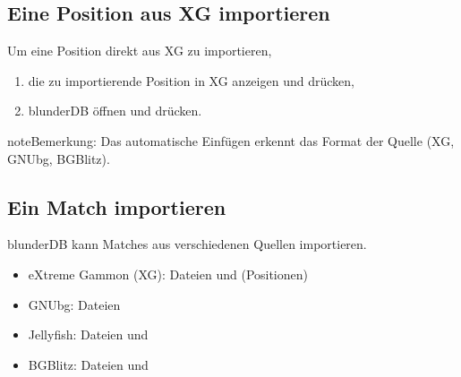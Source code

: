 \documentclass[letterpaper,10pt,german]{sphinxmanual}
\begin{document}
\subsection{Eine Position aus XG importieren}
\label{\detokenize{guide_utilisateur:import-une-position-depuis-xg}}
\sphinxAtStartPar
Um eine Position direkt aus XG zu importieren,
\begin{enumerate}
%
\item {} 
\sphinxAtStartPar
die zu importierende Position in XG anzeigen und  drücken,

\item {} 
\sphinxAtStartPar
blunderDB öffnen und  drücken.

\end{enumerate}

\begin{sphinxadmonition}{note}{Bemerkung:}
\sphinxAtStartPar
Das automatische Einfügen erkennt das Format der Quelle (XG, GNUbg, BGBlitz).
\end{sphinxadmonition}


\subsection{Ein Match importieren}
\label{\detokenize{guide_utilisateur:importer-un-match}}
\sphinxAtStartPar
blunderDB kann Matches aus verschiedenen Quellen importieren.

\sphinxAtStartPar
{}
\begin{itemize}
\item {} 
\sphinxAtStartPar
eXtreme Gammon (XG): Dateien  und  (Positionen)

\item {} 
\sphinxAtStartPar
GNUbg: Dateien 

\item {} 
\sphinxAtStartPar
Jellyfish: Dateien  und 

\item {} 
\sphinxAtStartPar
BGBlitz: Dateien  und 

\end{itemize}
\end{document}
